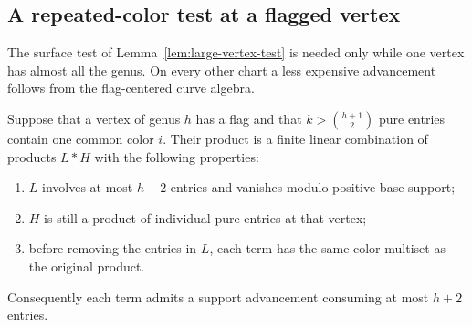\subsection{A repeated-color test at a flagged vertex}

The surface test of Lemma~\ref{lem:large-vertex-test} is needed only
while one vertex has almost all the genus.  On every other chart a less expensive advancement follows
from the flag-centered curve algebra.

\begin{lemma}
\label{lem:repeated-color}
Suppose that a vertex of genus \(h\) has a flag and that
\(k>\binom{h+1}{2}\) pure entries contain one common color \(i\).
Their product is a finite linear combination of products \(L*H\) with
the following properties:
\begin{enumerate}[label=\textup{(\roman*)}]
\item \(L\) involves at most \(h+2\) entries and vanishes modulo positive
base support;
\item \(H\) is still a product of individual pure entries at that vertex;
\item before removing the entries in \(L\), each term has the same color
multiset as the original product.
\end{enumerate}
Consequently each term admits a support advancement consuming at most
\(h+2\) entries.
\end{lemma}

